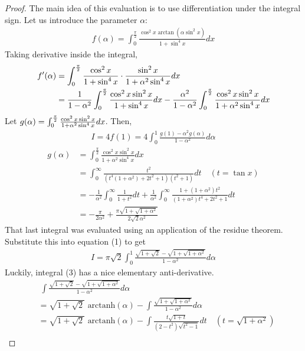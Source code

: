 \begin{proof}
The main idea of this evaluation is to use differentiation under the integral sign. Let us introduce the parameter $\alpha$: \begin{align*} f(\alpha)=\int_0^{\frac{\pi}{2}}\frac{\cos^2 x\arctan(\alpha \sin^2 x)}{1+\sin^4 x}dx \end{align*}
Taking derivative inside the integral,
\begin{align*}
f'(\alpha) &= \int_0^{\pi\over 2}\frac{\cos^2 x}{1+\sin^4 x}\cdot\frac{\sin^2 x}{1+\alpha^2 \sin^4 x}dx \\
&= \frac{1}{1-\alpha^2}\int_0^{\pi\over 2}\frac{\cos^2 x\sin^2 x}{1+\sin^4 x}dx-\frac{\alpha^2}{1-\alpha^2}\int_0^{\pi\over 2}\frac{\cos^2 x\sin^2 x}{1+\alpha^2 \sin^4 x}dx
\end{align*}
Let $g(\alpha)=\int_0^{\pi\over 2}\frac{\cos^2 x\sin^2 x}{1+\alpha^2 \sin^4 x}dx$. Then, 
\begin{align*}I=4f(1)=4\int_0^1\frac{g(1)-\alpha^2 g(\alpha)}{1-\alpha^2}d\alpha \tag{1}\end{align*}
\begin{align*}
g(\alpha) &= \int_0^{\frac{\pi}{2}}\frac{\cos^2 x\sin^2 x}{1+\alpha^2 \sin^4 x}dx \\
&= \int_0^\infty \frac{t^2}{\left(t^4(1+\alpha^2)+2t^2+1 \right)(t^2+1)}dt \quad (t=\tan x)\\
&= -\frac{1}{\alpha^2}\int_0^\infty\frac{1}{1+t^2}dt+\frac{1}{\alpha^2}\int_0^\infty\frac{1+(1+\alpha^2)t^2}{(1+\alpha^2)t^4+2t^2+1}dt \\
&= -\frac{\pi}{2\alpha^2}+\frac{\pi \sqrt{1+\sqrt{1+\alpha^2}}}{2\sqrt{2}\alpha^2}\tag{2}
\end{align*}
That last integral was evaluated using an application of the residue theorem. Substitute this into equation (1) to get
\begin{align*}I=\pi\sqrt{2}\int_0^1\frac{\sqrt{1+\sqrt{2}}-\sqrt{1+\sqrt{1+\alpha^2}}}{1- \alpha ^2 }d\alpha \tag{3}\end{align*}
Luckily, integral (3) has a nice elementary anti-derivative. \begin{align*}
&\; \int \frac{\sqrt{1+\sqrt{2}}-\sqrt{1+\sqrt{1+\alpha^2}}}{1-\alpha^2}d\alpha \\ &= \sqrt{1+\sqrt{2}}\text{ arctanh}(\alpha) -\int \frac{\sqrt{1+\sqrt{1+\alpha^2}}}{1-\alpha^2} d\alpha \\
&= \sqrt{1+\sqrt{2}}\text{ arctanh}(\alpha)-\int \frac{t\sqrt{1+t}}{(2-t^2)\sqrt{t^2-1}}dt\quad (t=\sqrt{1+\alpha^2}) \\

\end{align*}
\end{proof}
